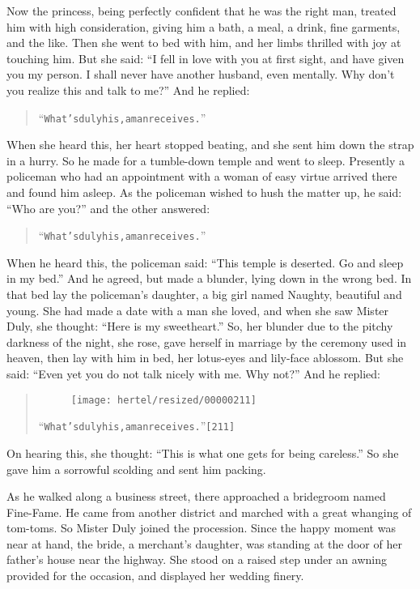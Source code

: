 \documentclass[article, twoside, 10pt]{memoir}
\renewenvironment{verbatim}{%
\begin{quote}%
\vskip -10pt%
\begin{alltt}\normalfont\small}{\end{alltt}%
\end{quote}%
\vskip -10pt
} %
\begin{document}
Now the princess, being perfectly confident that he was the right
man, treated him with high consideration, giving him a bath, a
meal, a drink, fine garments, and the like. Then she went to bed
with him, and her limbs thrilled with joy at touching him. But she
said:
``I fell in love with you at first sight, and have given you my person. I shall never have another husband, even mentally. Why don't you realize this and talk to me?''
And he replied:

\begin{verbatim}
“What's duly his, a man receives.”
\end{verbatim}
When she heard this, her heart stopped beating, and she sent him
down the strap in a hurry. So he made for a tumble-down temple and
went to sleep. Presently a policeman who had an appointment with a
woman of easy virtue arrived there and found him asleep. As the
policeman wished to hush the matter up, he said: ``Who are you?''
and the other answered:

\begin{verbatim}
“What's duly his, a man receives.”
\end{verbatim}
When he heard this, the policeman said:
``This temple is deserted. Go and sleep in my bed.'' And he agreed,
but made a blunder, lying down in the wrong bed. In that bed lay
the policeman's daughter, a big girl named Naughty, beautiful and
young. She had made a date with a man she loved, and when she saw
Mister Duly, she thought: ``Here is my sweetheart.'' So, her
blunder due to the pitchy darkness of the night, she rose, gave
herself in marriage by the ceremony used in heaven, then lay with
him in bed, her lotus-eyes and lily-face ablossom. But she said:
``Even yet you do not talk nicely with me. Why not?'' And he
replied:

\begin{verbatim}
\begin{figure}[p]\texttt{[image: hertel/resized/00000211]}\end{figure}“What's duly his, a man receives.”                      [211]
\end{verbatim}
On hearing this, she thought:
``This is what one gets for being careless.'' So she gave him a
sorrowful scolding and sent him packing.

As he walked along a business street, there approached a bridegroom
named Fine-Fame. He came from another district and marched with a
great whanging of tom-toms. So Mister Duly joined the procession.
Since the happy moment was near at hand, the bride, a merchant's
daughter, was standing at the door of her father's house near the
highway. She stood on a raised step under an awning provided for
the occasion, and displayed her wedding finery.
\end{document}
